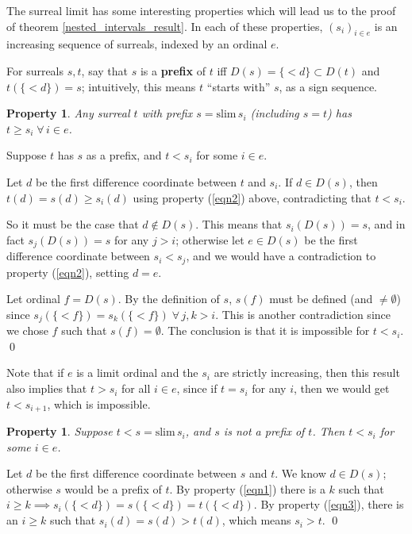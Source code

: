 \documentclass[11pt]{amsart}
\newtheorem{Prop}[Def]{Property}
\newcommand\bpf[1][]{\smallskip\noindent{\bf Proof#1.}\quad}
\newcommand\epf{\qed\medskip}
\newcommand{\slim}{\mathrm{slim}\,}
\begin{document}
The surreal limit has some interesting properties which will lead us to the proof of theorem
\ref{nested_intervals_result}.  In each of these properties, $(s_i)_{i\in e}$ is an increasing sequence
of surreals, indexed by an ordinal $e$.

For surreals $s,t$, say that $s$ is a {\bf prefix} of $t$ iff $D(s) = \{<d\} \subset D(t)$ and
$t(\{<d\}) = s$; intuitively, this means $t$ ``starts with'' $s$, as a sign sequence. 

\begin{Prop}\label{ub_prop}
Any surreal $t$ with prefix $s = \slim s_i$ (including $s=t$)
has $t \ge s_i\;\forall\, i\in e$.
\end{Prop}

\bpf
Suppose $t$ has $s$ as a prefix, and $t < s_i$ for some $i\in e$.

Let $d$ be the first difference coordinate between $t$ and $s_i$.
If $d\in D(s)$, then $t(d) = s(d) \ge s_i(d)$ using property (\ref{eqn2}) above,
contradicting that $t < s_i$.

So it must be the case that $d\not\in D(s)$.  This means that
$s_i(D(s)) = s$, and in fact $s_j(D(s)) = s$ for any $j > i$;
otherwise let $e\in D(s)$ be the first difference coordinate
between $s_i < s_j$, and we would have a contradiction to
property (\ref{eqn2}), setting $d=e$.

Let ordinal $f = D(s)$.  By the definition of $s$, $s(f)$ must be defined
(and $\ne\emptyset$) since $s_j(\{<f\}) = s_k(\{<f\})\;\forall\, j,k > i$.
This is another contradiction since we chose $f$ such that $s(f)=\emptyset$.
The conclusion is that it is impossible for $t < s_i$.
\epf

Note that if $e$ is a limit ordinal and the $s_i$ are strictly increasing,
then this result also implies that $t > s_i$ for all $i\in e$,
since if $t = s_i$ for any $i$, then we would get $t < s_{i+1}$, which is impossible.

\begin{Prop}\label{crossing_condition}
Suppose $t < s = \slim s_i$, and $s$ is not a prefix of $t$.
Then $t < s_i$ for some $i\in e$.
\end{Prop}

\bpf
Let $d$ be the first difference coordinate between $s$ and $t$.
We know $d\in D(s)$; otherwise $s$ would be a prefix of $t$.
By property (\ref{eqn1}) there is a $k$ such that
$i \ge k \implies s_i(\{<d\}) = s(\{<d\}) = t(\{<d\})$.
By property (\ref{eqn3}), there is an $i \ge k$ such that
$s_i(d) = s(d) > t(d)$, which means $s_i > t$.
\epf
\end{document}
